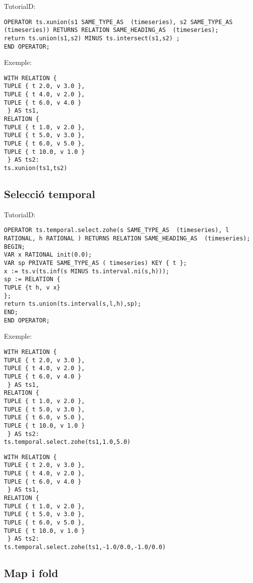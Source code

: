 TutorialD:
\begin{verbatim}
OPERATOR ts.xunion(s1 SAME_TYPE_AS  (timeseries), s2 SAME_TYPE_AS  (timeseries)) RETURNS RELATION SAME_HEADING_AS  (timeseries);
return ts.union(s1,s2) MINUS ts.intersect(s1,s2) ;
END OPERATOR;
\end{verbatim}


Exemple:
\begin{verbatim}
WITH RELATION {
TUPLE { t 2.0, v 3.0 },
TUPLE { t 4.0, v 2.0 },
TUPLE { t 6.0, v 4.0 }
 } AS ts1,
RELATION {
TUPLE { t 1.0, v 2.0 },
TUPLE { t 5.0, v 3.0 },
TUPLE { t 6.0, v 5.0 },
TUPLE { t 10.0, v 1.0 }
 } AS ts2: 
ts.xunion(ts1,ts2)
\end{verbatim}


\subsection{Selecció temporal}



TutorialD:
\begin{verbatim}
OPERATOR ts.temporal.select.zohe(s SAME_TYPE_AS  (timeseries), l RATIONAL, h RATIONAL ) RETURNS RELATION SAME_HEADING_AS  (timeseries);
BEGIN;
VAR x RATIONAL init(0.0);
VAR sp PRIVATE SAME_TYPE_AS ( timeseries) KEY { t };
x := ts.v(ts.inf(s MINUS ts.interval.ni(s,h)));
sp := RELATION {
TUPLE {t h, v x}
};
return ts.union(ts.interval(s,l,h),sp);
END;
END OPERATOR;
\end{verbatim}

Exemple:
\begin{verbatim}
WITH RELATION {
TUPLE { t 2.0, v 3.0 },
TUPLE { t 4.0, v 2.0 },
TUPLE { t 6.0, v 4.0 }
 } AS ts1,
RELATION {
TUPLE { t 1.0, v 2.0 },
TUPLE { t 5.0, v 3.0 },
TUPLE { t 6.0, v 5.0 },
TUPLE { t 10.0, v 1.0 }
 } AS ts2:
ts.temporal.select.zohe(ts1,1.0,5.0)
\end{verbatim}
\begin{verbatim}
WITH RELATION {
TUPLE { t 2.0, v 3.0 },
TUPLE { t 4.0, v 2.0 },
TUPLE { t 6.0, v 4.0 }
 } AS ts1,
RELATION {
TUPLE { t 1.0, v 2.0 },
TUPLE { t 5.0, v 3.0 },
TUPLE { t 6.0, v 5.0 },
TUPLE { t 10.0, v 1.0 }
 } AS ts2:
ts.temporal.select.zohe(ts1,-1.0/0.0,-1.0/0.0)
\end{verbatim}



\subsection{Map i fold}



